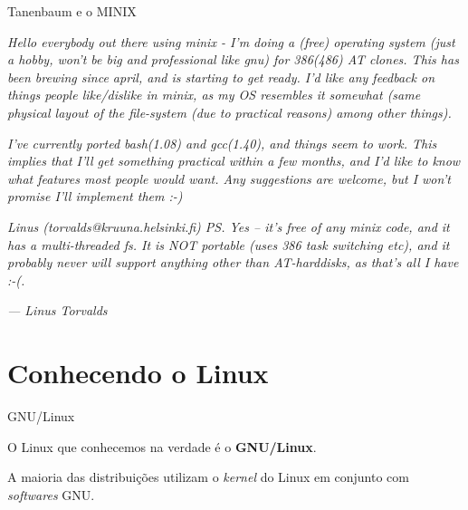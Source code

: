\documentclass[size=14pt,
style=paintings
]{powerdot}
\newenvironment{vslide}{\vspace{\stretch{1}}}{\vspace{\stretch{1}}}
\begin{document}
\begin{slide}{Tanenbaum e o MINIX}

\footnotesize \emph{Hello everybody out there using minix -
 I'm doing a (free) operating system (just a hobby, won't be big and professional like gnu) for 386(486) AT clones. This has been brewing since april, and is starting to get ready. I'd like any feedback on things people like/dislike in minix, as my OS resembles it somewhat (same physical layout of the file-system (due to practical reasons) among other things).}

\vspace{0.5cm}
 \emph{I've currently ported bash(1.08) and gcc(1.40), and things seem to work. This implies that I'll get something practical within a few months, and I'd like to know what features most people would want. Any suggestions are welcome, but I won't promise I'll implement them :-)}
\vspace{0.5cm}

 \emph{Linus (torvalds@kruuna.helsinki.fi)
 PS. Yes – it's free of any minix code, and it has a multi-threaded fs. It is NOT portable (uses 386 task switching etc), and it probably never will support anything other than AT-harddisks, as that's all I have :-(.
}
\vspace{0.2cm}

 \emph{— Linus Torvalds}
\end{slide}

\section{Conhecendo o Linux}

\begin{slide}{GNU/Linux}

\begin{vslide}
O Linux que conhecemos na verdade é o \textbf{GNU/Linux}.

\vspace{0.5cm}

A maioria das distribuições utilizam o \textit{kernel} do Linux em conjunto com \textit{softwares} GNU.
\end{vslide}

   \begin{figure}[!h]
   \end{figure}

\end{slide}
\end{document}
